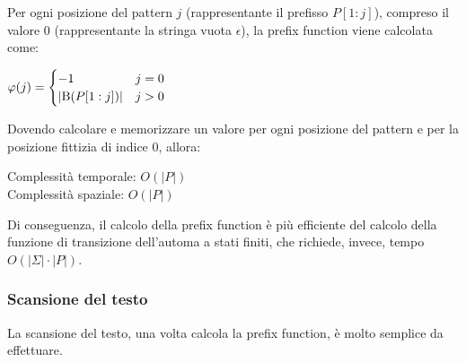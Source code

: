 Per ogni posizione del pattern $j$ (rappresentante il prefisso $P[1:j]$), compreso il valore 0 (rappresentante la stringa vuota $\epsilon$), la prefix function viene calcolata come:
\begin{center}
    $\varphi(j) = \begin{cases}
        -1 & j = 0 \\
        |\textnormal{B}(P[1:j])| & j > 0
    \end{cases}$
\end{center}
Dovendo calcolare e memorizzare un valore per ogni posizione del pattern e per la posizione fittizia di indice 0, allora:
\begin{center}
    Complessità temporale: $O(|P|)$\\
    Complessità spaziale: $O(|P|)$
\end{center}
Di conseguenza, il calcolo della prefix function è più efficiente del calcolo della funzione di transizione dell'automa a stati finiti, che richiede, invece, tempo $O(|\Sigma| \cdot |P|)$.
\subsubsection{Scansione del testo}
La scansione del testo, una volta calcola la prefix function, è molto semplice da effettuare.

